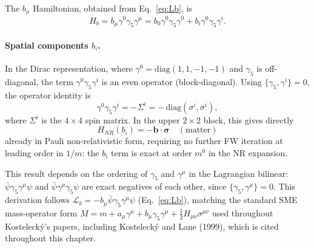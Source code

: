 \documentclass[main]{subfiles}
\begin{document}
The $b_\mu$ Hamiltonian, obtained from Eq.~\eqref{eq:Lb}, is
\begin{equation}
  H_b = b_\mu\gamma^0\gamma_5\gamma^\mu
      = b_0\gamma^0\gamma_5\gamma^0 + b_i\gamma^0\gamma_5\gamma^i.
\end{equation}

\paragraph{Spatial components $b_i$.} In the Dirac representation, where
$\gamma^0=\mathrm{diag}(1,1,-1,-1)$ and $\gamma_5$ is off-diagonal, the term
$\gamma^0\gamma_5\gamma^i$ is an even operator (block-diagonal). Using
$\{\gamma_5,\gamma^i\}=0$, the operator identity is
\begin{equation}
  \gamma^0\gamma_5\gamma^i = -\Sigma^i = -\,\mathrm{diag}(\sigma^i,\sigma^i),
\end{equation}
where $\Sigma^i$ is the $4\times4$ spin matrix. In the upper $2\times2$
block, this gives directly
\begin{equation}
  \boxed{H_{NR}(b_i) = -\mathbf b\cdot\boldsymbol\sigma \quad (\text{matter})}
  \label{eq:HNR-bi-matter}
\end{equation}
already in Pauli non-relativistic form, requiring no further FW iteration at
leading order in $1/m$: the $b_i$ term is exact at order $m^0$ in the NR
expansion.

This result depends on the ordering of $\gamma_5$ and $\gamma^\mu$ in the
Lagrangian bilinear: $\bar\psi\gamma_5\gamma^\mu\psi$ and
$\bar\psi\gamma^\mu\gamma_5\psi$ are exact negatives of each other, since
$\{\gamma_5,\gamma^\mu\}=0$. This derivation follows
$\mathcal L_b=-b_\mu\bar\psi\gamma_5\gamma^\mu\psi$
(Eq.~\eqref{eq:Lb}), matching the standard SME mass-operator form
$M=m+a_\mu\gamma^\mu+b_\mu\gamma_5\gamma^\mu+\tfrac12H_{\mu\nu}\sigma^{\mu\nu}$
used throughout Kostelecký's papers, including Kostelecký and Lane (1999),
which is cited throughout this chapter.
\end{document}
